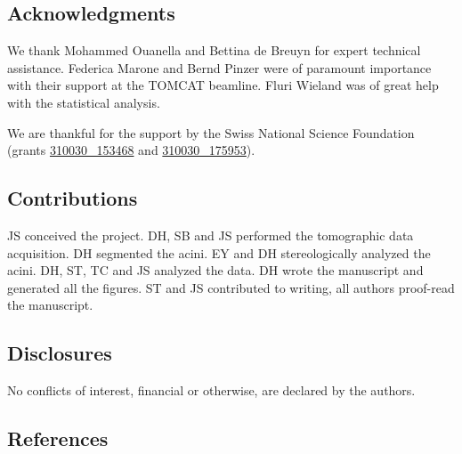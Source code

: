\documentclass[
  american,
]{article}
\begin{document}
\hypertarget{acknowledgments}{%
\subsection{Acknowledgments}\label{acknowledgments}}

We thank Mohammed Ouanella and Bettina de Breuyn for expert technical assistance.
Federica Marone and Bernd Pinzer were of paramount importance with their support at the TOMCAT beamline.
Fluri Wieland was of great help with the statistical analysis.

We are thankful for the support by the Swiss National Science Foundation (grants \href{http://p3.snf.ch/project-153468}{310030\_153468} and \href{http://p3.snf.ch/project-175953}{310030\_175953}).

\hypertarget{contributions}{%
\subsection{Contributions}\label{contributions}}

JS conceived the project.
DH, SB and JS performed the tomographic data acquisition.
DH segmented the acini.
EY and DH stereologically analyzed the acini.
DH, ST, TC and JS analyzed the data.
DH wrote the manuscript and generated all the figures.
ST and JS contributed to writing, all authors proof-read the manuscript.

\hypertarget{disclosures}{%
\subsection{Disclosures}\label{disclosures}}

No conﬂicts of interest, financial or otherwise, are declared by the authors.

\hypertarget{references}{%
\subsection{References}\label{references}}
\end{document}
